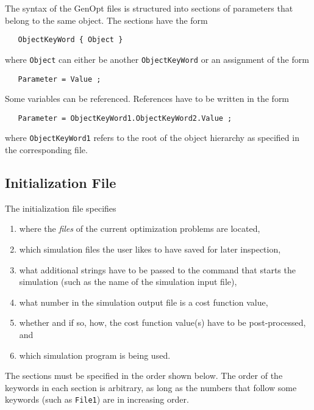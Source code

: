 The syntax of the GenOpt files is structured into sections of parameters that belong to the same object. The sections have the form
\begin{lstlisting}
   ObjectKeyWord { Object }
\end{lstlisting}
where \verb$Object$ can either be another \verb$ObjectKeyWord$
or an assignment of the form
\begin{lstlisting}
   Parameter = Value ;
\end{lstlisting}

Some variables can be referenced. 
References have to be written in the form
\begin{lstlisting}
   Parameter = ObjectKeyWord1.ObjectKeyWord2.Value ;
\end{lstlisting}
where \verb$ObjectKeyWord1$ refers to the root of the object hierarchy as specified in the corresponding file.\\

\subsection{Initialization File}
\label{sec:IniFilSyn}
The initialization file specifies 
\begin{enumerate}
\item where the \emph{files} of the current optimization problems are located,
\item which simulation files the user likes to have saved for later inspection,
\item what additional strings have to be passed to the command that starts the simulation (such as the name of the simulation input file),
\item what number in the simulation output file is a cost function value,
\item whether and if so, how, the cost function value(s) have to be post-processed,
and
\item which simulation program is being used.
\end{enumerate}

The sections must be specified in the order shown below.
The order of the keywords in each section is arbitrary, as long as the numbers that follow some keywords (such as \texttt{File1}) are in increasing order.\\

